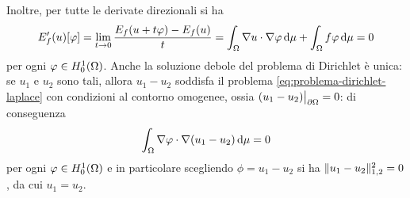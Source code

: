 Inoltre, per tutte le derivate direzionali si ha
\begin{equation}
    E_f'(u)[\phi]=
    \lim_{t\to 0}\frac{E_f(u+t\phi)-E_f(u)}{t}=
    \int_\Omega\scalar{\grad u}{\grad\phi}\,\dd\mu+\int_\Omega f\phi\,\dd\mu=0
\end{equation}
per ogni $\phi\in\sobHc[1]{\Omega}$.
Anche la soluzione debole del problema di Dirichlet è unica: se $u_1$ e $u_2$ sono tali, allora $u_1-u_2$ soddisfa il problema \eqref{eq:problema-dirichlet-laplace} con condizioni al contorno omogenee, ossia $(u_1-u_2)\big|_{\boundary\Omega}=0$: di conseguenza
\begin{equation}
    \int_\Omega\scalar{\grad\phi}{\grad(u_1-u_2)}\,\dd\mu=0
\end{equation}
per ogni $\phi\in\sobHc[1]{\Omega}$ e in particolare scegliendo $\phi=u_1-u_2$ si ha $\norm{u_1-u_2}_{1,2}^2=0$, da cui $u_1=u_2$.


